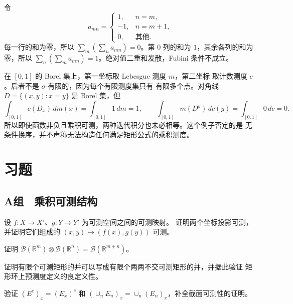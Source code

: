 \begin{counterexample}
令
\[
 a_{mn}=
 \begin{cases}
 1,&n=m,\\
 -1,&n=m+1,\\
 0,&\text{其他}.
 \end{cases}
\]
每一行的和为零，所以 \(\sum_m(\sum_na_{mn})=0\)。第 \(0\) 列的和为
\(1\)，其余各列的和为零，所以
\(\sum_n(\sum_ma_{mn})=1\)。绝对值二重和发散，Fubini 条件不成立。
\end{counterexample}

\begin{counterexample}
在 \([0,1]\) 的 Borel 集上，第一坐标取 Lebesgue 测度 \(m\)，第二坐标
取计数测度 \(c\)。后者不是 \(\sigma\)-有限的，因为每个有限测度集只有
有限多个点。对角线 \(D=\{(x,y):x=y\}\) 是 Borel 集，但
\[
 \int_{[0,1]}c(D_x)\,dm(x)=\int_{[0,1]}1\,dm=1,
 \qquad
 \int_{[0,1]}m(D^y)\,dc(y)=\int_{[0,1]}0\,dc=0.
\]
所以即使函数非负且乘积可测，两种迭代积分也未必相等。这个例子否定的是
无条件换序，并不声称无法构造任何满足矩形公式的乘积测度。
\end{counterexample}

\section*{习题}
\subsection*{A组　乘积可测结构}
\begin{enumerate}[label=\textbf{\thechapter.\arabic*.}]
设 \(f:X\to X'\)、\(g:Y\to Y'\) 为可测空间之间的可测映射。
证明两个坐标投影可测，并证明它们组成的
\((x,y)\mapsto(f(x),g(y))\) 可测。

证明
\(\mathcal B(\mathbb R^m)\otimes\mathcal B(\mathbb R^n)
=\mathcal B(\mathbb R^{m+n})\)。

证明有限个可测矩形的并可以写成有限个两两不交可测矩形的并，并据此验证
矩形环上预测度定义的良定义性。

验证 \((E^c)_x=(E_x)^c\) 和
\((\cup_nE_n)_x=\cup_n(E_n)_x\)，补全截面可测性的证明。

\end{enumerate}

